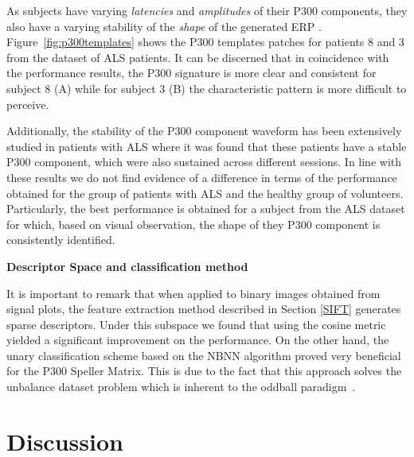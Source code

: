 \documentclass[utf8]{frontiersSCNS} %
\begin{document}
As subjects have varying \textit{latencies} and \textit{amplitudes} of their P300 components, they also have a varying stability of the \textit{shape} of the generated ERP \citep{Nam2010}.  Figure~\ref{fig:p300templates} shows the P300 templates patches for patients 8 and 3 from the dataset of ALS patients. It can be discerned that in coincidence with the performance results, the P300 signature is more clear and consistent for subject 8 (A) while for subject 3 (B) the characteristic pattern is more difficult to perceive.

Additionally, the stability of the P300 component waveform has been extensively studied in patients with ALS \citep{SellersandEmanuelDonchin2006,TomohiroMadarame2008,Nijboer2009,Mak2012,McCane2015} where it was found that these patients have a stable P300 component, which were also sustained across different sessions.  In line with these results we do not find evidence of a difference in terms of the performance obtained for the group of patients with ALS and the healthy group of volunteers. Particularly, the best performance is obtained for a subject from the ALS dataset for which, based on visual observation, the shape of they P300 component is consistently identified.

\textbf{Descriptor Space and classification method}

It is important to remark that when applied to binary images obtained from signal plots, the feature extraction method described in Section \ref{SIFT} generates sparse descriptors.  Under this subspace we found that using the cosine metric yielded a significant improvement on the performance. On the other hand, the unary classification scheme based on the NBNN algorithm proved very beneficial for the P300 Speller Matrix.  This is due to the fact that this approach solves the unbalance dataset problem which is inherent to the oddball paradigm~\citep{Tibon2015}.  


\section{Discussion}
\label{discussion}

\end{document}
